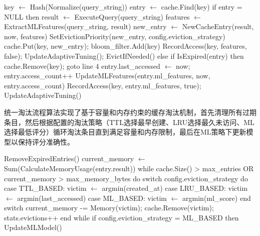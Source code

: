 \begin{algorithm}[htbp]
\caption{命中与插入流程}
\label{alg4_4_1}
\begin{algorithmic}[1]
\STATE key $\leftarrow$ Hash(Normalize(query\_string)) 
\STATE entry $\leftarrow$ cache.Find(key) 
\STATE if entry = NULL then 
\STATE \quad result $\leftarrow$ ExecuteQuery(query\_string) 
\STATE \quad features $\leftarrow$ ExtractMLFeatures(query\_string, result) 
\STATE \quad new\_entry $\leftarrow$ NewCacheEntry(result, now, features) 
\STATE \quad SetEvictionPriority(new\_entry, config.eviction\_strategy) 
\STATE \quad cache.Put(key, new\_entry); bloom\_filter.Add(key) 
\STATE \quad RecordAccess(key, features, false); UpdateAdaptiveTuning(); EvictIfNeeded() 
\STATE else 
\STATE \quad if IsExpired(entry) then cache.Remove(key); goto line 4 
\STATE \quad entry.last\_accessed $\leftarrow$ now; entry.access\_count++ 
\STATE \quad UpdateMLFeatures(entry.ml\_features, now, entry.access\_count) 
\STATE \quad RecordAccess(key, entry.ml\_features, true); UpdateAdaptiveTuning() 
\end{algorithmic}
\end{algorithm}

统一淘汰流程算法实现了基于容量和内存约束的缓存淘汰机制，首先清理所有过期条目，然后根据配置的淘汰策略（TTL选择最早创建、LRU选择最久未访问、ML选择最低评分）循环淘汰条目直到满足容量和内存限制，最后在ML策略下更新模型以保持评分准确性。

\begin{algorithm}[H]
\caption{统一淘汰流程}
\label{alg4_4_2}
\begin{algorithmic}[1]
\STATE RemoveExpiredEntries() 
\STATE current\_memory $\leftarrow$ Sum(CalculateMemoryUsage(entry.result))
\STATE while cache.Size() > max\_entries OR current\_memory > max\_memory\_bytes do
\STATE switch config.eviction\_strategy do 
\STATE case TTL\_BASED: victim $\leftarrow$ argmin(created\_at)
\STATE case LRU\_BASED: victim $\leftarrow$ argmin(last\_accessed)
\STATE case ML\_BASED: victim $\leftarrow$ argmin(ml\_score)
\STATE end switch
\STATE current\_memory -= Memory(victim); cache.Remove(victim); stats.evictions++
\STATE end while
\STATE if config.eviction\_strategy = ML\_BASED then UpdateMLModel()
\end{algorithmic}
\end{algorithm}



